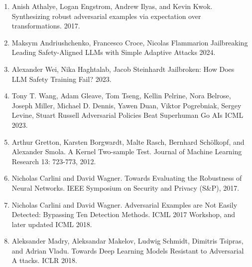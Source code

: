 \documentclass[11pt]{report}
\begin{document}
\begin{enumerate}

\item Anish Athalye, Logan Engstrom, Andrew Ilyas, and Kevin Kwok.
Synthesizing robust adversarial examples via expectation over transformations.
2017.

\item  Maksym Andriushchenko, Francesco Croce, Nicolas Flammarion
Jailbreaking Leading Safety-Aligned LLMs with Simple Adaptive Attacks
2024.

\item Alexander Wei, Nika Haghtalab, Jacob Steinhardt
Jailbroken: How Does LLM Safety Training Fail?
2023.

\item Tony T. Wang, Adam Gleave, Tom Tseng, Kellin Pelrine, Nora Belrose, Joseph Miller, Michael D. Dennis, Yawen Duan, Viktor Pogrebniak, Sergey Levine, Stuart Russell
Adversarial Policies Beat Superhuman Go AIs
ICML 2023.

\item Arthur Gretton, Karsten Borgwardt, Malte Rasch, Bernhard Schölkopf, and Alexander Smola.
A Kernel Two-sample Test.
Journal of Machine Learning Research 13: 723-773, 2012.

\item Nicholas Carlini and David Wagner.
Towards Evaluating the Robustness of Neural Networks.
IEEE Symposium on Security and Privacy (S&P), 2017.

\item Nicholas Carlini and David Wagner.
Adversarial Examples are Not Easily Detected: Bypassing Ten Detection Methods.
ICML 2017 Workshop, and later updated ICML 2018.

\item Aleksander Madry, Aleksandar Makelov, Ludwig Schmidt, Dimitris Tsipras, and Adrian Vladu.
Towards Deep Learning Models Resistant to Adversarial A
ttacks.
ICLR 2018.

\end{enumerate}
\end{document}
